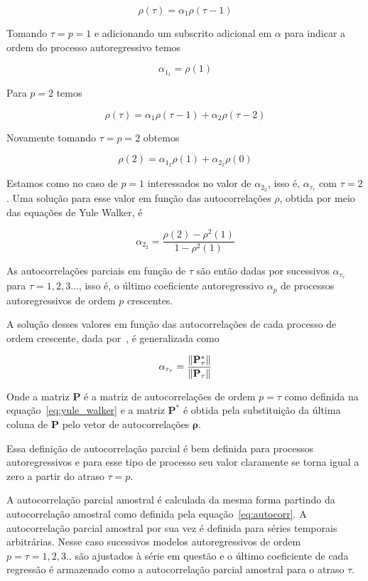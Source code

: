 $$ \rho(\tau) = \alpha_1 \rho(\tau - 1) $$

Tomando $\tau = p = 1$ e adicionando um subscrito adicional em $\alpha$ para
indicar a ordem do processo autoregressivo temos

$$ \alpha_{1_{1}} = \rho(1) $$

Para $p=2$ temos

$$ \rho(\tau) = \alpha_1 \rho(\tau - 1) + \alpha_2 \rho(\tau - 2) $$

Novamente tomando $\tau = p = 2$ obtemos

$$ \rho(2) = \alpha_{1_{2}} \rho(1) + \alpha_{2_{2}} \rho(0) $$

Estamos como no caso de $p=1$ interessados no valor de $\alpha_{2_{2}}$, isso é,
$\alpha_{\tau_{\tau}}$ com $\tau=2$. Uma solução para esse valor em função
das autocorrelações $\rho$, obtida por meio das equações de Yule Walker, é

$$ \alpha_{2_{2}} = \frac{\rho(2) - \rho^2(1)}{1 - \rho^2(1)} $$

As autocorrelações parciais em função de $\tau$ são então dadas por sucessivos
$\alpha_{\tau_{\tau}}$ para $\tau = 1, 2, 3 ...$, isso é, o último coeficiente
autoregressivo $\alpha_p$ de processos autoregressivos de ordem $p$ crescentes.

A solução desses valores em função das autocorrelações de cada processo de
ordem crescente, dada por~\cite{morettin}, é generalizada como

$$ \alpha_{\tau_{\tau}} = \frac{\lVert\mathbf{P}^*_{\tau}\rVert}{\lVert\mathbf{P}_{\tau}\rVert} $$

Onde a matriz $\mathbf{\mathbf{P}}$ é a matriz de autocorrelações de ordem $p =
\tau$ como definida na equação~\ref{eq:yule_walker} e a matriz
$\mathbf{P}^*$ é obtida pela substituição da última coluna de
$\mathbf{P}$ pelo vetor de autocorrelações $\mathbf{\rho}$.

Essa definição de autocorrelação parcial é bem definida para processos
autoregressivos e para esse tipo de processo seu valor claramente se torna
igual a zero a partir do atraso $\tau = p$.

A autocorrelação parcial amostral é calculada da mesma forma partindo da
autocorrelação amostral como definida pela equação~\ref{eq:autocorr}. A
autocorrelação parcial amostral por sua vez é definida para séries temporais
arbitrárias. Nesse caso sucessivos modelos autoregressivos de ordem $p = \tau =
1, 2, 3..$ são ajustados à série em questão e o último coeficiente
de cada regressão é armazenado como a autocorrelação parcial amostral para o
atraso $\tau$.

